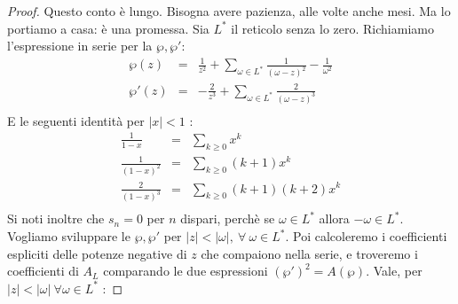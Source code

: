 \begin{proof}
Questo conto è lungo. Bisogna avere pazienza, alle volte anche mesi. Ma lo portiamo a casa: è una promessa. \newline
Sia $L^*$ il reticolo senza lo zero. Richiamiamo l'espressione in serie per la $\wp, \wp'$:
\begin{eqnarray*}
\wp(z) & = & \frac{1}{z^2} + \sum_{\omega \in L^*} \frac{1}{(\omega-z)^2} -\frac{1}{\omega^2} \\
\wp'(z) & = & -\frac{2}{z^3} + \sum_{\omega \in L^*} \frac{2}{(\omega-z)^3} \\
\end{eqnarray*}
E le seguenti identità per $|x| < 1$ :
\begin{eqnarray*}
\frac{1}{1-x} & = & \sum_{k \ge 0} x^k \\
\frac{1}{(1-x)^2} & = & \sum_{k \ge 0} (k+1)x^k \\
\frac{2}{(1-x)^3} & = & \sum_{k \ge 0} (k+1)(k+2) x^k \\
\end{eqnarray*}
Si noti inoltre che $s_n=0$ per $n$ dispari, perchè se $\omega \in L^*$ allora $-\omega \in L^*$. Vogliamo sviluppare le $\wp, \wp'$ per $|z| < |\omega|, \ \forall \ \omega \in L^*$. Poi calcoleremo i coefficienti espliciti delle potenze negative di $z$ che compaiono nella serie, e troveremo i coefficienti di $A_L$ comparando le due espressioni $(\wp')^2 = A(\wp)$. Vale, per $|z| < |\omega| \ \forall \omega \in L^*$ :


\end{proof}
